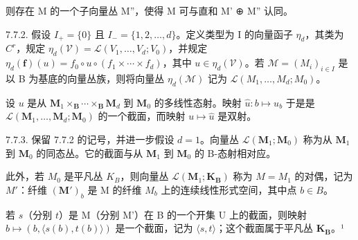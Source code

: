 则存在 M 的一个子向量丛 M''，使得 M 可与直和 M' ⊕ M'' 认同。

7.7.2. 假设 \(I_{+}=\{0\}\) 且 \(I_{-}=\{1,2,\ldots,d\}\)。定义类型为 I 的向量函子 \(\eta_{d}\)，其类为 \(C^{r}\)，规定 \(\eta_{d}(\mathcal{V})=\mathcal{L}(V_{1},\ldots,V_{d};V_{0})\)，并规定 \(\eta_{d}(\mathbf{f})(u)=f_{0}\circ u\circ(f_{1}\times\cdots\times f_{d})\)，其中 \(u\in\eta_{d}(\mathcal{V})\)。若 \(\mathcal{M}=(M_{i})_{i\in I}\) 是以 B 为基底的向量丛族，则将向量丛 \(\eta_{d}(\mathcal{M})\) 记为 \(\mathcal{L}(M_{1},\ldots,M_{d};M_{0})\)。

设 \(u\) 是从 \(\mathbf{M}_{1} \times_{\mathbf{B}} \cdots \times_{\mathbf{B}} \mathbf{M}_{d}\) 到 \(\mathbf{M}_{0}\) 的多线性态射。映射 \(\hat{u}: b \mapsto u_{b}\) 于是是 \(\mathcal{L}(\mathbf{M}_{1}, \ldots, \mathbf{M}_{d}; \mathbf{M}_{0})\) 的一个截面，而映射 \(u \mapsto \hat{u}\) 是双射。

7.7.3. 保留 7.7.2 的记号，并进一步假设 \(d=1\)。向量丛 \(\mathcal{L}(\mathbf{M}_{1};\mathbf{M}_{0})\) 称为从 \(\mathbf{M}_{1}\) 到 \(\mathbf{M}_{0}\) 的同态丛。它的截面与从 \(\mathbf{M}_{1}\) 到 \(\mathbf{M}_{0}\) 的 B-态射相对应。

此外，若 \(M_{0}\) 是平凡丛 \(K_{B}\)，则向量丛 \(\mathcal{L}(\mathbf{M}_{1};\mathbf{K}_{\mathbf{B}})\) 称为 \(M = M_{1}\) 的对偶，记为 \(M'\)：纤维 \((\mathbf{M}')_{b}\) 是 M 的纤维 \(M_{b}\) 上的连续线性形式空间，其中点 \(b \in B\)。

若 \(s\)（分别 \(t\)）是 M（分别 M'）在 B 的一个开集 U 上的截面，则映射 \(b \mapsto (b, \langle s(b), t(b) \rangle)\) 是一个截面，记为 \(\langle s, t \rangle\)；这个截面属于平凡丛 \(\mathbf{K}_{\mathbf{B}}\)。¹


